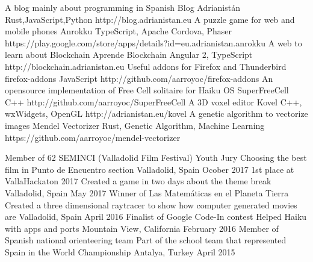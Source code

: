 \documentclass[]{awesome-cv}
\begin{document}
\vspace{-7mm}
\begin{cventries}
	\cventry
	{A blog mainly about programming in Spanish}
	{Blog Adrianistán}
	{Rust,JavaScript,Python}
	{http://blog.adrianistan.eu}
	{}
	\cventry
	{A puzzle game for web and mobile phones}
	{Anrokku}
	{TypeScript, Apache Cordova, Phaser}
	{}
	{https://play.google.com/store/apps/details?id=eu.adrianistan.anrokku}
	\cventry
	{A web to learn about Blockchain}
	{Aprende Blockchain}
	{Angular 2, TypeScript}
	{http://blockchain.adrianistan.eu}
	{}
	\cventry
	{Useful addons for Firefox and Thunderbird}
	{firefox-addons}
	{JavaScript}
	{http://github.com/aarroyoc/firefox-addons}
	{}
	\cventry
	{An opensource implementation of Free Cell solitaire for Haiku OS}
	{SuperFreeCell}
	{C++}
	{http://github.com/aarroyoc/SuperFreeCell}
	{}
	\cventry
	{A 3D voxel editor}
	{Kovel}
	{C++, wxWidgets, OpenGL}
	{http://adrianistan.eu/kovel}
	{}
	\cventry
	{A genetic algorithm to vectorize images}
	{Mendel Vectorizer}
	{Rust, Genetic Algorithm, Machine Learning}
	{https://github.com/aarroyoc/mendel-vectorizer}
	{}

	\vspace{-5mm}
\end{cventries}
\begin{cvhonors}
	\cvhonor
	{Member of 62 SEMINCI (Valladolid Film Festival) Youth Jury}
	{Choosing the best film in Punto de Encuentro section}
	{Valladolid, Spain}
	{Ocober 2017}
	\cvhonor
	{1st place at VallaHackaton 2017}
	{Created a game in two days about the theme \textquotedbl{}break\textquotedbl{}}
	{Valladolid, Spain}
	{May 2017}
	\cvhonor
	{Winner of \textquotedbl{}Las Matemáticas en el Planeta Tierra\textquotedbl{}}
	{Created a three dimensional raytracer to show how computer generated movies are}
	{Valladolid, Spain}
	{April 2016}
	\cvhonor
	{Finalist of Google Code-In contest}
	{Helped Haiku with apps and ports}
	{Mountain View, California}
	{February 2016}
	\cvhonor
	{Member of Spanish national orienteering team}
	{Part of the school team that represented Spain in the World Championship}
	{Antalya, Turkey}
	{April 2015}
\end{cvhonors}
\ 
\end{document}
